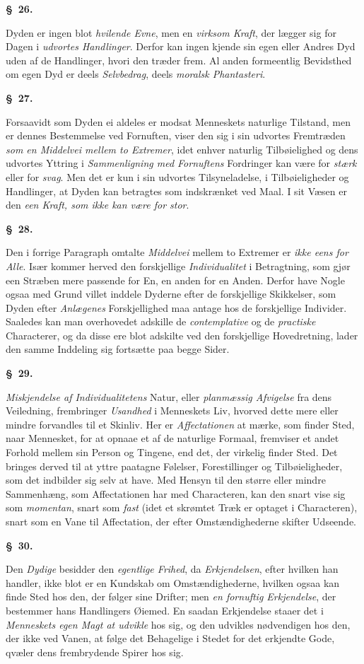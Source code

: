 \documentclass[12pt]{article}
\newcommand{\opage}[1]{\marginnote{\footnotesize\textit{[#1]}}}
\newcommand{\slaw}[1]{\par\medskip\begin{center}\textbf{\S~#1.}\end{center}\nopagebreak}
\begin{document}
\slaw{26}
Dyden er ingen blot \emph{hvilende Evne}, men en \emph{virksom Kraft}, der lægger sig for Dagen i \emph{udvortes Handlinger}. Derfor kan ingen kjende sin egen eller Andres Dyd uden af de Handlinger, hvori den træder frem. Al anden formeentlig Bevidsthed om egen Dyd er deels \emph{Selvbedrag}, deels \emph{moralsk Phantasteri}.

\slaw{27}
Forsaavidt som Dyden ei aldeles er modsat Menneskets naturlige Tilstand, men er dennes Bestemmelse ved Fornuften, viser den sig i sin udvortes Fremtræden \emph{som en Middelvei mellem to Extremer}, idet enhver naturlig Tilbøielighed og dens udvortes Yttring i \emph{Sammenligning med Fornuftens} Fordringer kan være for \emph{stærk} eller for \emph{svag}. Men det er kun i sin udvortes Tilsyneladelse, i Tilbøieligheder og Handlinger, at Dyden kan betragtes som indskrænket ved Maal. I sit Væsen er den \emph{een Kraft, som ikke kan være for stor}.

\slaw{28}
Den i forrige Paragraph omtalte \emph{Middelvei} mellem to Extremer er \emph{ikke eens for Alle}. Især kommer herved den forskjellige \emph{Individualitet} i Betragtning, som gjør een Stræ\opage{155}ben mere passende for En, en anden for en Anden. Derfor have Nogle ogsaa med Grund villet inddele Dyderne efter de forskjellige Skikkelser, som Dyden efter \emph{Anlægenes} Forskjellighed maa antage hos de forskjellige Individer. Saaledes kan man overhovedet adskille de \emph{contemplative} og de \emph{practiske} Characterer, og da disse ere blot adskilte ved den forskjellige Hovedretning, lader den samme Inddeling sig fortsætte paa begge Sider.

\slaw{29}
\emph{Miskjendelse af Individualitetens} Natur, eller \emph{planmæssig Afvigelse} fra dens Veiledning, frembringer \emph{Usandhed} i Menneskets Liv, hvorved dette mere eller mindre forvandles til et Skinliv. Her er \emph{Affectationen} at mærke, som finder Sted, naar Mennesket, for at opnaae et af de naturlige Formaal, fremviser et andet Forhold mellem sin Person og Tingene, end det, der virkelig finder Sted. Det bringes derved til at yttre paatagne Følelser, Forestillinger og Tilbøieligheder, som det indbilder sig selv at have. Med Hensyn til den større eller mindre Sammenhæng, som Affectationen har med Characteren, kan den snart vise sig som \emph{momentan}, snart som \emph{fast} (idet et skrømtet Træk er optaget i Characteren), snart som en Vane til Affectation, der efter Omstændighederne skifter Udseende.

\slaw{30}
Den \emph{Dydige} besidder den \emph{egentlige Frihed}, da \emph{Erkjendelsen}, efter hvilken han handler, ikke blot er en Kundskab om Omstændighederne, hvilken ogsaa kan finde Sted hos den, der følger sine Drifter; men \emph{en fornuftig Erkjendelse}, der bestemmer hans Handlingers Øiemed. En saadan Erkjendelse staaer det i \emph{Menneskets egen Magt at udvikle} hos sig, og den udvikles nødvendigen hos den, der ikke ved Vanen, at følge det Behagelige i Stedet for det erkjendte Gode, qvæler dens frembrydende Spirer hos sig.
\end{document}
